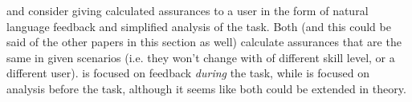 \citeauthor{Wang2016-id} and \citeauthor{Aitken2016-fb} consider giving calculated assurances to a user in the form of natural language feedback and simplified analysis of the task. Both (and this could be said of the other papers in this section as well) calculate assurances that are the same in given scenarios (i.e. they won't change with of different skill level, or a different user). \citet{Wang2016-id} is focused on feedback \emph{during} the task, while \citet{Aitken2016-fb} is focused on analysis before the task, although it seems like both could be extended in theory.
